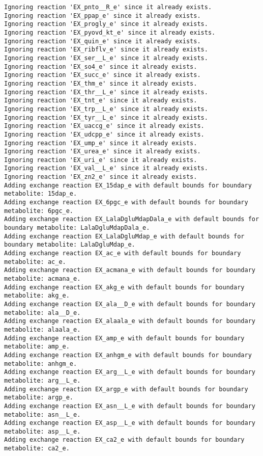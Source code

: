 \documentclass[
  letterpaper,
  DIV=11,
  numbers=noendperiod]{scrartcl}
\begin{document}
\begin{verbatim}
Ignoring reaction 'EX_pnto__R_e' since it already exists.
Ignoring reaction 'EX_ppap_e' since it already exists.
Ignoring reaction 'EX_progly_e' since it already exists.
Ignoring reaction 'EX_pyovd_kt_e' since it already exists.
Ignoring reaction 'EX_quin_e' since it already exists.
Ignoring reaction 'EX_ribflv_e' since it already exists.
Ignoring reaction 'EX_ser__L_e' since it already exists.
Ignoring reaction 'EX_so4_e' since it already exists.
Ignoring reaction 'EX_succ_e' since it already exists.
Ignoring reaction 'EX_thm_e' since it already exists.
Ignoring reaction 'EX_thr__L_e' since it already exists.
Ignoring reaction 'EX_tnt_e' since it already exists.
Ignoring reaction 'EX_trp__L_e' since it already exists.
Ignoring reaction 'EX_tyr__L_e' since it already exists.
Ignoring reaction 'EX_uaccg_e' since it already exists.
Ignoring reaction 'EX_udcpp_e' since it already exists.
Ignoring reaction 'EX_ump_e' since it already exists.
Ignoring reaction 'EX_urea_e' since it already exists.
Ignoring reaction 'EX_uri_e' since it already exists.
Ignoring reaction 'EX_val__L_e' since it already exists.
Ignoring reaction 'EX_zn2_e' since it already exists.
Adding exchange reaction EX_15dap_e with default bounds for boundary metabolite: 15dap_e.
Adding exchange reaction EX_6pgc_e with default bounds for boundary metabolite: 6pgc_e.
Adding exchange reaction EX_LalaDgluMdapDala_e with default bounds for boundary metabolite: LalaDgluMdapDala_e.
Adding exchange reaction EX_LalaDgluMdap_e with default bounds for boundary metabolite: LalaDgluMdap_e.
Adding exchange reaction EX_ac_e with default bounds for boundary metabolite: ac_e.
Adding exchange reaction EX_acmana_e with default bounds for boundary metabolite: acmana_e.
Adding exchange reaction EX_akg_e with default bounds for boundary metabolite: akg_e.
Adding exchange reaction EX_ala__D_e with default bounds for boundary metabolite: ala__D_e.
Adding exchange reaction EX_alaala_e with default bounds for boundary metabolite: alaala_e.
Adding exchange reaction EX_amp_e with default bounds for boundary metabolite: amp_e.
Adding exchange reaction EX_anhgm_e with default bounds for boundary metabolite: anhgm_e.
Adding exchange reaction EX_arg__L_e with default bounds for boundary metabolite: arg__L_e.
Adding exchange reaction EX_argp_e with default bounds for boundary metabolite: argp_e.
Adding exchange reaction EX_asn__L_e with default bounds for boundary metabolite: asn__L_e.
Adding exchange reaction EX_asp__L_e with default bounds for boundary metabolite: asp__L_e.
Adding exchange reaction EX_ca2_e with default bounds for boundary metabolite: ca2_e.

\end{verbatim}
\end{document}
